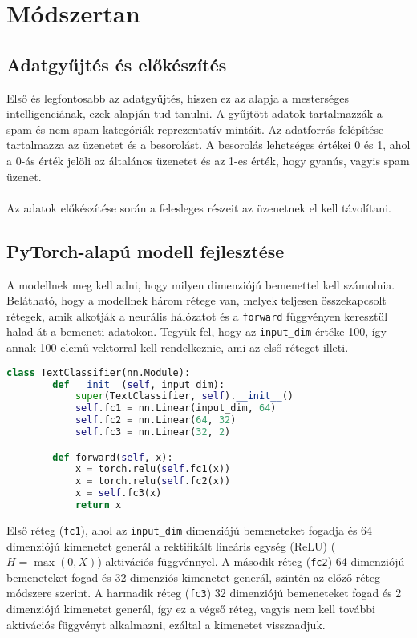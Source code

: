 ﻿\section{Módszertan}

\lstset{
  basicstyle=\small\ttfamily,
  captionpos=b,
  frame=single,
  breaklines=true,
  showstringspaces=false,
  aboveskip=2.5pt,
  belowskip=2pt
}

\subsection{Adatgyűjtés és előkészítés}
Első és legfontosabb az adatgyűjtés, hiszen ez az alapja a mesterséges intelligenciának, ezek alapján tud tanulni. A gyűjtött adatok tartalmazzák a spam és nem spam kategóriák reprezentatív mintáit. Az adatforrás felépítése tartalmazza az üzenetet és a besorolást. A besorolás lehetséges értékei 0 és 1, ahol a 0-ás érték jelöli az általános üzenetet és az 1-es érték, hogy gyanús, vagyis spam üzenet. \\ \\
\indent Az adatok előkészítése során a felesleges részeit az üzenetnek el kell távolítani.

\subsection{PyTorch-alapú modell fejlesztése}
A modellnek meg kell adni, hogy milyen dimenziójú bemenettel kell számolnia. Belátható, hogy a modellnek három rétege van, melyek teljesen összekapcsolt rétegek, amik alkotják a neurális hálózatot és a \verb|forward| függvényen keresztül halad át a bemeneti adatokon. Tegyük fel, hogy az \verb|input_dim| értéke 100, így annak 100 elemű vektorral kell rendelkeznie, ami az első réteget illeti.
\begin{lstlisting}[language=Python, caption={Modell Python kód tartalma}, label=modell]
    class TextClassifier(nn.Module):
        def __init__(self, input_dim):
            super(TextClassifier, self).__init__()
            self.fc1 = nn.Linear(input_dim, 64)
            self.fc2 = nn.Linear(64, 32)
            self.fc3 = nn.Linear(32, 2)

        def forward(self, x):
            x = torch.relu(self.fc1(x))
            x = torch.relu(self.fc2(x))
            x = self.fc3(x)
            return x
\end{lstlisting}
\indent \indent Első réteg (\verb|fc1|), ahol az \verb|input_dim| dimenziójú bemeneteket fogadja és 64 dimenziójú kimenetet generál a rektifikált lineáris egység (ReLU) ($H = \mathop{\mathrm{max}}(0, X)$) aktivációs függvénnyel. A második réteg (\verb|fc2|) 64 dimenziójú bemeneteket fogad és 32 dimenziós kimenetet generál, szintén az előző réteg módszere szerint. A harmadik réteg (\verb|fc3|) 32 dimenziójú bemeneteket fogad és 2 dimenziójú kimenetet generál, így ez a végső réteg, vagyis nem kell további aktivációs függvényt alkalmazni, ezáltal a kimenetet visszaadjuk.

